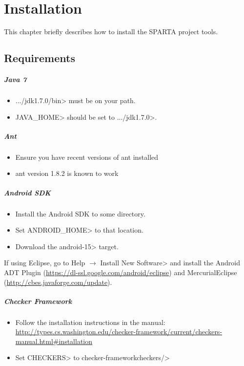 \htmlhr
\chapter{Installation\label{installation}}

This chapter briefly describes how to install the SPARTA project tools.

\section {Requirements}
\paragraph{Java 7}
\begin{itemize}

 \item  \<.../jdk1.7.0/bin> must be on your path.
 \item \<JAVA\_HOME> should be set to \<.../jdk1.7.0>.
\end{itemize}

\paragraph{Ant}
\begin{itemize}
\item Ensure you have recent versions of ant  installed
 \item ant version 1.8.2 is known to work
\end{itemize}

\paragraph{Android SDK}
\begin{itemize}
 \item Install the Android SDK to some directory. 
 \item Set \<ANDROID\_HOME> to that location.
 \item Download the \<android-15> target.
\end{itemize}

If using Eclipse, go to
\<Help $\rightarrow$ Install New Software>
and install the Android ADT Plugin (\url{https://dl-ssl.google.com/android/eclipse}) and MercurialEclipse (\url{http://cbes.javaforge.com/update}).

\paragraph{Checker Framework}
\begin{itemize}
\item Follow the installation instructions in the manual: 
\url{http://types.cs.washington.edu/checker-framework/current/checkers-manual.html#installation}
\item Set \<CHECKERS> to \<checker-framework\/checkers/>
\end{itemize}


